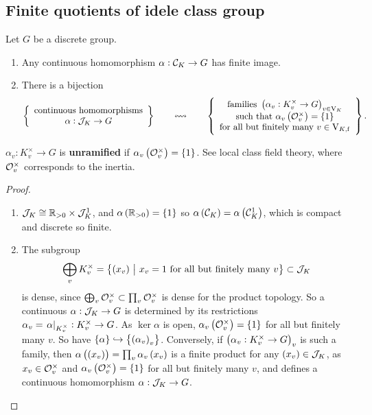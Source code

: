 \subsection{Finite quotients of idele class group}

\begin{proposition}
\label{prop:8.1}
Let $ G $ be a discrete group.
\begin{enumerate}
\item Any continuous homomorphism $ \alpha : \mathcal{C}_K \to G $ has finite image.
\item There is a bijection
$$ \correspondence{\text{continuous homomorphisms} \\ \alpha : \JJJ_K \to G}{\text{families} \ \br{\alpha_v : K_v^\times \to G}_{v \in \V_K} \\ \text{such that} \ \alpha_v\br{\OOO_v^\times} = \cbr{1} \\ \text{for all but finitely many} \ v \in \V_{K, \f}}. $$
\end{enumerate}
\end{proposition}

\begin{notation*}
$ \alpha_v : K_v^\times \to G $ is \textbf{unramified} if $ \alpha_v\br{\OOO_v^\times} = \cbr{1} $. See local class field theory, where $ \mathcal{O}_v^\times $ corresponds to the inertia.
\end{notation*}

\begin{proof}
\hfill
\begin{enumerate}
\item $ \mathcal{J}_K \cong \mathbb{R}_{> 0} \times \mathcal{J}_K^1 $, and $ \alpha\br{\RR_{> 0}} = \cbr{1} $ so $ \alpha\br{\CCC_K} = \alpha\br{\CCC_K^1} $, which is compact and discrete so finite.
\item The subgroup
$$ \bigoplus_v K_v^\times = \cbr{\br{x_v} \st x_v = 1 \ \text{for all but finitely many} \ v} \subset \JJJ_K $$
is dense, since $ \bigoplus_v \mathcal{O}_v^\times \subset \prod_v \mathcal{O}_v^\times $ is dense for the product topology. So a continuous $ \alpha : \mathcal{J}_K \to G $ is determined by its restrictions $ \alpha_v = \left. \alpha \right|_{K_v^\times} : K_v^\times \to G $. As $ \ker \alpha $ is open, $ \alpha_v\br{\OOO_v^\times} = \cbr{1} $ for all but finitely many $ v $. So have $ \cbr{\alpha} \hookrightarrow \cbr{\br{\alpha_v}_v} $. Conversely, if $ \br{\alpha_v : K_v^\times \to G}_v $ is such a family, then $ \alpha\br{\br{x_v}} = \prod_v \alpha_v\br{x_v} $ is a finite product for any $ \br{x_v} \in \JJJ_K $, as $ x_v \in \mathcal{O}_v^\times $ and $ \alpha_v\br{\OOO_v^\times} = \cbr{1} $ for all but finitely many $ v $, and defines a continuous homomorphism $ \alpha : \mathcal{J}_K \to G $.
\end{enumerate}
\end{proof}

